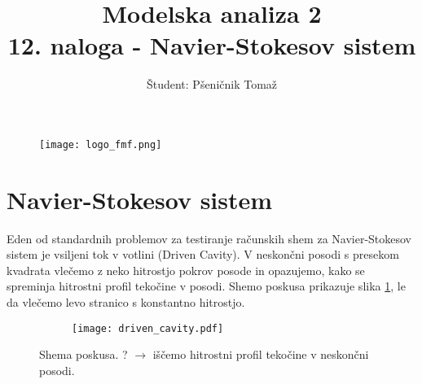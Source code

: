 \documentclass[12pt,a4paper]{article}
\title{\textbf{Modelska analiza 2} \\ 12. naloga - Navier-Stokesov sistem \\}
\author{Študent: Pšeničnik Tomaž}
\begin{document}

	\begin{figure} [h]
  \centering
  \texttt{[image: logo\_fmf.png]}
  \maketitle
\end{figure}
	
	
	
	\newpage
	
	

\section*{Navier-Stokesov sistem}

Eden od standardnih problemov za testiranje računskih shem za Navier-Stokesov sistem je vsiljeni tok v votlini (Driven Cavity). V neskončni posodi s presekom kvadrata vlečemo z neko hitrostjo pokrov posode in opazujemo, kako se spreminja hitrostni profil tekočine v posodi. Shemo poskusa prikazuje slika \ref{fig:slika1}, le da vlečemo levo stranico s konstantno hitrostjo.

\begin{figure}[H]
    \centering
    \begin{subfigure}[b]{0.35\textwidth}  			
        \texttt{[image: driven\_cavity.pdf]}
    \end{subfigure}
    \caption{Shema poskusa. ? $\rightarrow$ iščemo hitrostni profil tekočine v neskončni posodi.} \label{fig:slika1}
\end{figure}
\end{document}

